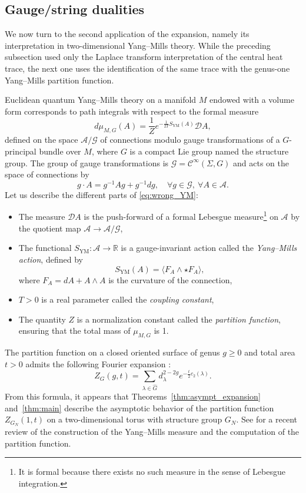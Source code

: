 \documentclass[11pt,a4paper,reqno]{article}
\theoremstyle{definition}
\theoremstyle{remark}
\newcommand\R{\mathbb{R}}
\newcommand\YM{\mathrm{YM}}
\begin{document}
\subsection{Gauge/string dualities}\label{sec:string}

We now turn to the second application of the expansion, namely its interpretation in two-dimensional Yang--Mills theory. While the preceding subsection used only the Laplace transform interpretation of the central heat trace, the next one uses the identification of the same trace with the genus-one Yang--Mills partition function.

Euclidean quantum Yang--Mills theory on a manifold $M$ endowed with a volume form corresponds to path integrals with respect to the formal measure
\begin{equation}\label{eq:wrong_YM}
d\mu_{M,G}(A)=\frac{1}{Z}e^{-\frac{1}{2T}S_{\YM}(A)}\mathcal{D}A,
\end{equation}
defined on the space $\mathcal{A}/\mathcal{G}$ of connections modulo gauge transformations of a $G$-principal bundle over $M$, where $G$ is a compact Lie group named the structure group. The group of gauge transformations is $\mathcal{G}=\mathscr{C}^\infty(\Sigma,G)$ and acts on the space of connections by
\[
g\cdot A = g^{-1}A g + g^{-1}dg,\quad \forall g\in\mathcal{G},\ \forall A\in\mathcal{A}.
\]
Let us describe the different parts of \eqref{eq:wrong_YM}:
\begin{itemize}
\item The measure $\mathcal{D}A$ is the push-forward of a formal Lebesgue measure\footnote{It is formal because there exists no such measure in the sense of Lebesgue integration.} on $\mathcal{A}$ by the quotient map $\mathcal{A}\to\mathcal{A}/\mathcal{G}$,
\item The functional $S_{\YM}:\mathcal{A}\to\R$ is a gauge-invariant action called the \emph{Yang--Mills action}, defined by
\[
S_\YM(A)=\langle F_A\wedge\star F_A\rangle,
\]
where $F_A=dA+A\wedge A$ is the curvature of the connection, 
\item $T>0$ is a real parameter called the \emph{coupling constant},
\item The quantity $Z$ is a normalization constant called the \emph{partition function}, ensuring that the total mass of $\mu_{M,G}$ is 1.
\end{itemize}
The partition function on a closed oriented surface of genus $g\geq 0$ and total area $t>0$ admits the following Fourier expansion \cite{Rus,Wit}:
\begin{equation}\label{eq:Migdal}
Z_G(g,t)=\sum_{\lambda\in\widehat{G}}d_\lambda^{2-2g}e^{-\frac{t}{2}c_2(\lambda)}.
\end{equation}
From this formula, it appears that Theorems~\ref{thm:asympt_expansion} and~\ref{thm:main} describe the asymptotic behavior of the partition function $Z_{G_N}(1,t)$ on a two-dimensional torus with structure group $G_N$. See \cite{Lem4} for a recent review of the construction of the Yang--Mills measure and the computation of the partition function.
\end{document}
